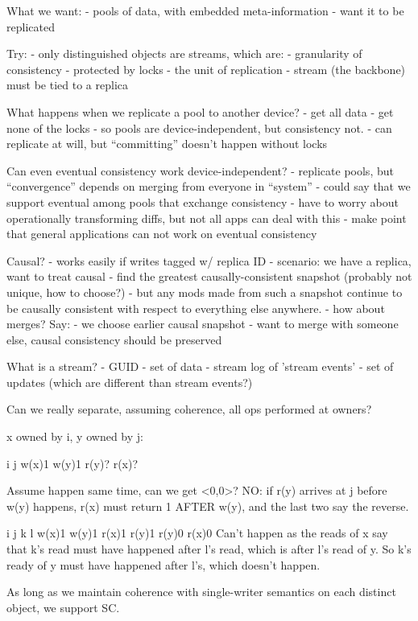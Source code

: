 What we want:
- pools of data, with embedded meta-information
- want it to be replicated

Try:
- only distinguished objects are streams, which are:
  - granularity of consistency
  - protected by locks
  - the unit of replication
  - stream (the backbone) must be tied to a replica

What happens when we replicate a pool to another device?
- get all data
- get none of the locks
- so pools are device-independent, but consistency not.
  - can replicate at will, but ``committing'' doesn't happen without
  locks

Can even eventual consistency work device-independent?
- replicate pools, but ``convergence'' depends on merging from
  everyone in ``system''
- could say that we support eventual among pools that exchange
consistency
- have to worry about operationally transforming diffs, but not all
  apps can deal with this
- make point that general applications can not work on eventual consistency

Causal?
- works easily if writes tagged w/ replica ID
- scenario: we have a replica, want to treat causal
  - find the greatest causally-consistent snapshot (probably not
  unique, how to choose?)
  - but any mods made from such a snapshot continue to be causally
    consistent with respect to everything else anywhere.
  - how about merges? Say:
    - we choose earlier causal snapshot 
    - want to merge with someone else, causal consistency should be
      preserved

What is a stream?
- GUID
- set of data
- stream log of 'stream events'
- set of updates (which are different than stream events?)

Can we really separate, assuming coherence, all ops performed at owners?

x owned by i, y owned by j:

i      j
w(x)1  w(y)1
r(y)?  r(x)?

Assume happen same time, can we get <0,0>?
NO: if r(y) arrives at j before w(y) happens, r(x) must return 1
AFTER w(y), and the last two say the reverse.

  i      j      k      l
w(x)1  w(y)1
              r(x)1  r(y)1
              r(y)0  r(x)0
Can't happen as the reads of x say that k's read must have happened
after l's read, which is after l's read of y. So k's ready of y must
have happened after l's, which doesn't happen.

As long as we maintain coherence with single-writer semantics on each
distinct object, we support SC.


